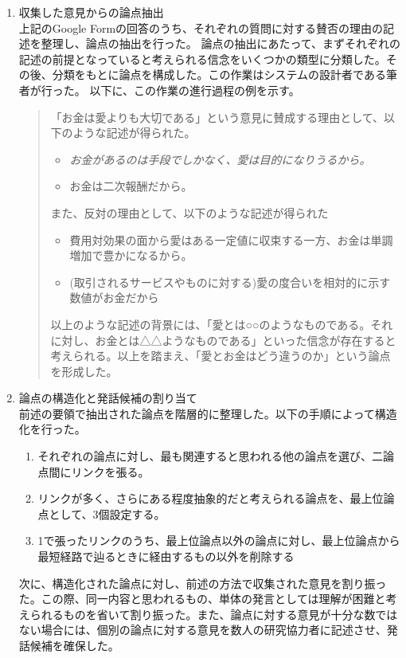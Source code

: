\documentclass[11pt, a4paper]{jreport} %
\begin{document}
\begin{enumerate}
\item 収集した意見からの論点抽出\\
上記のGoogle Formの回答のうち、それぞれの質問に対する賛否の理由の記述を整理し、論点の抽出を行った。
論点の抽出にあたって、まずそれぞれの記述の前提となっていると考えられる信念をいくつかの類型に分類した。その後、分類をもとに論点を構成した。この作業はシステムの設計者である筆者が行った。
以下に、この作業の進行過程の例を示す。
\begin{quote}
「お金は愛よりも大切である」という意見に賛成する理由として、以下のような記述が得られた。
\begin{itemize}
\item \textsl{お金があるのは手段でしかなく、愛は目的になりうるから。}
\item お金は二次報酬だから。
\end{itemize}
また、反対の理由として、以下のような記述が得られた
\begin{itemize}
\item 費用対効果の面から愛はある一定値に収束する一方、お金は単調増加で豊かになるから。
\item (取引されるサービスやものに対する)愛の度合いを相対的に示す数値がお金だから
\end{itemize}


以上のような記述の背景には、「愛とは○○のようなものである。それに対し、お金とは△△ようなものである」といった信念が存在すると考えられる。以上を踏まえ、「愛とお金はどう違うのか」という論点を形成した。
\end{quote}

\item  論点の構造化と発話候補の割り当て\\
前述の要領で抽出された論点を階層的に整理した。以下の手順によって構造化を行った。
\begin{enumerate}
\renewcommand{\labelenumii}{(\arabic{enumii}).}
\item それぞれの論点に対し、最も関連すると思われる他の論点を選び、二論点間にリンクを張る。
\item リンクが多く、さらにある程度抽象的だと考えられる論点を、最上位論点として、3個設定する。
\item 1で張ったリンクのうち、最上位論点以外の論点に対し、最上位論点から最短経路で辿るときに経由するもの以外を削除する
\end{enumerate}


次に、構造化された論点に対し、前述の方法で収集された意見を割り振った。この際、同一内容と思われるもの、単体の発言としては理解が困難と考えられるものを省いて割り振った。また、論点に対する意見が十分な数ではない場合には、個別の論点に対する意見を数人の研究協力者に記述させ、発話候補を確保した。




\end{enumerate}
\end{document}
